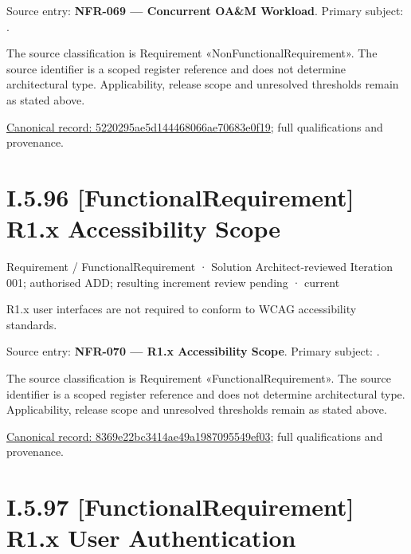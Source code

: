 Source entry: \textbf{NFR-069 — Concurrent OA\&M Workload}. Primary subject: \texttt{}.



The source classification is Requirement «NonFunctionalRequirement». The source identifier is a scoped register reference and does not determine architectural type. Applicability, release scope and unresolved thresholds remain as stated above.


{\footnotesize \href{../../../../continuum/motivation/requirement/non-functional-requirement/5220295ae5d144468066ae70683e0f19.md}{Canonical record: 5220295ae5d144468066ae70683e0f19}; full qualifications and provenance.}\par
\section*{I.5.96 [FunctionalRequirement] R1.x Accessibility Scope}
\label{navigation:I.5.96}

\label{element:8369e22bc3414ae49a1987095549ef03}
{\small Requirement / FunctionalRequirement · Solution Architect-reviewed Iteration 001; authorised ADD; resulting increment review pending · current}\par

R1.x user interfaces are not required to conform to WCAG accessibility standards.



Source entry: \textbf{NFR-070 — R1.x Accessibility Scope}. Primary subject: \texttt{}.



The source classification is Requirement «FunctionalRequirement». The source identifier is a scoped register reference and does not determine architectural type. Applicability, release scope and unresolved thresholds remain as stated above.


{\footnotesize \href{../../../../continuum/motivation/requirement/functional-requirement/8369e22bc3414ae49a1987095549ef03.md}{Canonical record: 8369e22bc3414ae49a1987095549ef03}; full qualifications and provenance.}\par
\section*{I.5.97 [FunctionalRequirement] R1.x User Authentication}
\label{navigation:I.5.97}

